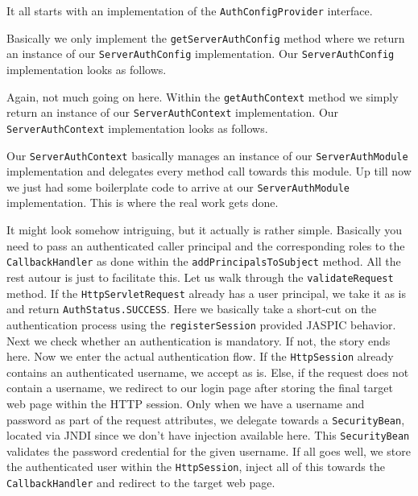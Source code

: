 It all starts with an implementation of the \texttt{AuthConfigProvider} interface.

Basically we only implement the \texttt{getServerAuthConfig} method where we return an instance of our \texttt{ServerAuthConfig} implementation.
Our  \texttt{ServerAuthConfig} implementation looks as follows.

Again, not much going on here.
Within the \texttt{getAuthContext} method we simply return an instance of our \texttt{ServerAuthContext} implementation.
Our \texttt{ServerAuthContext} implementation looks as follows.

Our \texttt{ServerAuthContext} basically manages an instance of our \texttt{ServerAuthModule} implementation and delegates every method call towards this module.
Up till now we just had some boilerplate code to arrive at our \texttt{ServerAuthModule} implementation.
This is where the real work gets done.

It might look somehow intriguing, but it actually is rather simple.
Basically you need to pass an authenticated caller principal and the corresponding roles to the \texttt{CallbackHandler} as done within the \texttt{addPrincipalsToSubject} method.
All the rest autour is just to facilitate this.
Let us walk through the \texttt{validateRequest} method.
If the \texttt{HttpServletRequest} already has a user principal, we take it as is and return \texttt{AuthStatus.SUCCESS}.
Here we basically take a short-cut on the authentication process using the 
\texttt{registerSession} provided JASPIC behavior.
Next we check whether an authentication is mandatory.
If not, the story ends here.
Now we enter the actual authentication flow.
If the \texttt{HttpSession} already contains an authenticated username, we accept as is.
Else, if the request does not contain a username, we redirect to our login page after storing the final target web page within the HTTP session.
Only when we have a username and password as part of the request attributes,
we delegate towards a \texttt{SecurityBean},
located via JNDI since we don't have injection available here.
This \texttt{SecurityBean} validates the password credential for the given username.
If all goes well, we store the authenticated user within the \texttt{HttpSession},
inject all of this towards the \texttt{CallbackHandler} and redirect to the target web page.

